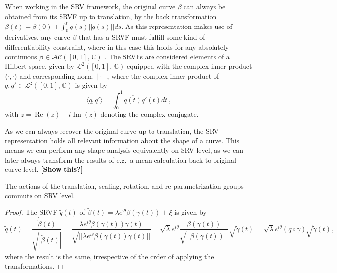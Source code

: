 \noindent When working in the SRV framework, the original curve $\beta$ can always be obtained from its SRVF up to translation, by the back transformation $\beta(t) = \beta(0) + \int_0^t q(s) || q(s) || ds$.
As this representation makes use of derivatives, any curve $\beta$ that has a SRVF must fulfill some kind of differentiability constraint, where in this case this holds for any absolutely continuous $\beta \in \mathcal{AC}([0,1],\, \mathbb{C})$ \parencite[see][134]{SrivastavaKlassen2016}.
The SRVFs are considered elements of a Hilbert space, given by $\mathcal{L}^2([0,1],\,\mathbb{C})$ equipped with the complex inner product $\langle \cdot, \cdot \rangle$ and corresponding norm $||\cdot||$, where the complex inner product of $q,q' \in \mathcal{L}^2([0,1],\,\mathbb{C})$ is given by
$$ \langle q, q' \rangle = \int_0^1 \overline{q(t)} q'(t) dt \,, $$
with $\overline{z} = \operatorname{Re}(z) - i \operatorname{Im}(z)$ denoting the complex conjugate.

As we can always recover the original curve up to translation, the SRV representation holds all relevant information about the shape of a curve.
This means we can perform any shape analysis equivalently on SRV level, as we can later always transform the results of e.g.\ a mean calculation back to original curve level.
\textbf{[Show this?]}

\begin{lemma}
  The actions of the translation, scaling, rotation, and re-parametrization groups commute on SRV level.
\end{lemma}

\begin{proof} The SRVF $\tilde q(t)$ of  $\tilde\beta(t) = \lambda e^{i\theta}\beta\left(\gamma(t)\right) + \xi$ is given by
$$ \tilde q (t) 
  = \frac{\dot{\tilde\beta}(t)}{\sqrt{| \dot{\tilde\beta}(t) |}} 
  = \frac{\lambda e^{i\theta} \dot\beta\left(\gamma(t)\right) \dot\gamma(t)}{\sqrt{||\lambda e^{i\theta} \dot\beta\left(\gamma(t)\right) \dot\gamma(t)||}} 
  = \sqrt{\lambda} e^{i\theta} \frac{\dot\beta\left(\gamma(t)\right)}{\sqrt{||\dot\beta\left(\gamma(t)\right)||}} \sqrt{\dot\gamma(t)} 
  = \sqrt\lambda e^{i\theta} \left( q \circ \gamma \right) \sqrt{\dot\gamma(t)},$$
where the result is the same, irrespective of the order of applying the transformations.
\end{proof}

